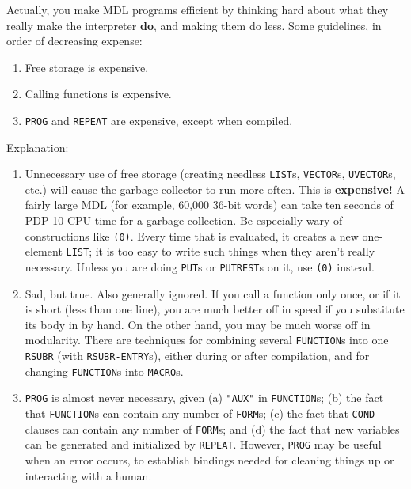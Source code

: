 \documentclass[a4paper,]{article}
\providecommand{\tightlist}{%
  \setlength{\itemsep}{0pt}\setlength{\parskip}{0pt}}
\begin{document}
Actually, you make MDL programs efficient by thinking hard about what they really make the interpreter \textbf{do}, and
making them do less. Some guidelines, in order of decreasing expense:

\begin{enumerate}
\def\labelenumi{\arabic{enumi}.}
\tightlist
\item
  Free storage is expensive.
\item
  Calling functions is expensive.
\item
  \texttt{PROG} and \texttt{REPEAT} are expensive, except when compiled.
\end{enumerate}

Explanation:

\begin{enumerate}
\def\labelenumi{\arabic{enumi}.}
\tightlist
\item
  Unnecessary use of free storage (creating needless \texttt{LIST}s,
  \texttt{VECTOR}s, \texttt{UVECTOR}s, etc.) will cause the garbage
  collector to run more often. This is \textbf{expensive!} A fairly large MDL (for example, 60,000 36-bit words) can take
  ten seconds of PDP-10 CPU time for a garbage collection. Be especially wary of constructions like \texttt{(0)}. Every
  time that is evaluated, it creates a new one-element \texttt{LIST}; it is too easy to write such things when they aren't
  really necessary. Unless you are doing \texttt{PUT}s or \texttt{PUTREST}s on it, use \texttt{\textquotesingle{}(0)}
  instead.
\item
  Sad, but true. Also generally ignored. If you call a function only once, or if it is short (less than one line), you are
  much better off in speed if you substitute its body in by hand. On the other hand, you may be much worse off in
  modularity. There are techniques for combining several \texttt{FUNCTION}s into one \texttt{RSUBR} (with
  \texttt{RSUBR-ENTRY}s), either during or after compilation, and for changing \texttt{FUNCTION}s into \texttt{MACRO}s.
\item
  \texttt{PROG} is almost never necessary, given (a) \texttt{"AUX"} in \texttt{FUNCTION}s; (b) the fact that
  \texttt{FUNCTION}s can contain any number of \texttt{FORM}s; (c) the fact that \texttt{COND} clauses can contain any
  number of \texttt{FORM}s; and (d) the fact that new variables can be generated and initialized by \texttt{REPEAT}.
  However, \texttt{PROG} may be useful when an error occurs, to establish bindings needed for cleaning things up or
  interacting with a human.
\end{enumerate}
\end{document}
